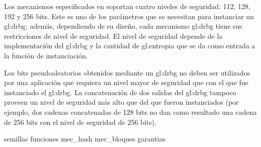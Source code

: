 Los mecanismos especificados en \cite{nist_aleatorios} soportan cuatro niveles
de seguridad: 112, 128, 192 y 256 bits. Este es uno de los parámetros que
se necesitan para instanciar un \gls{gl:drbg}; además, dependiendo de su diseño,
cada mecanismo  \gls{gl:drbg} tiene sus restricciones de nivel de seguridad.
El nivel de seguridad depende de la implementación del \gls{gl:drbg} y la
cantidad de \gls{gl:entropia} que se da como entrada a la función de
instanciación.

Los bits pseudoaleatorios obtenidos mediante un \gls{gl:drbg} no deben ser
utilizados por una aplicación que requiera un nivel mayor de seguridad que con
el que fue instanciado el \gls{gl:drbg}. La concatenación de dos salidas del
\gls{gl:drbg} tampoco proveen un nivel de seguridad más alto que del que fueron
instanciados (por ejemplo, dos cadenas concatenadas de 128 bits no dan como
resultado una cadena de 256 bits con el nivel de seguridad de 256 bits).

{semillas}
{funciones}
{mec_hash}
{mec_bloques}
{garantias}
